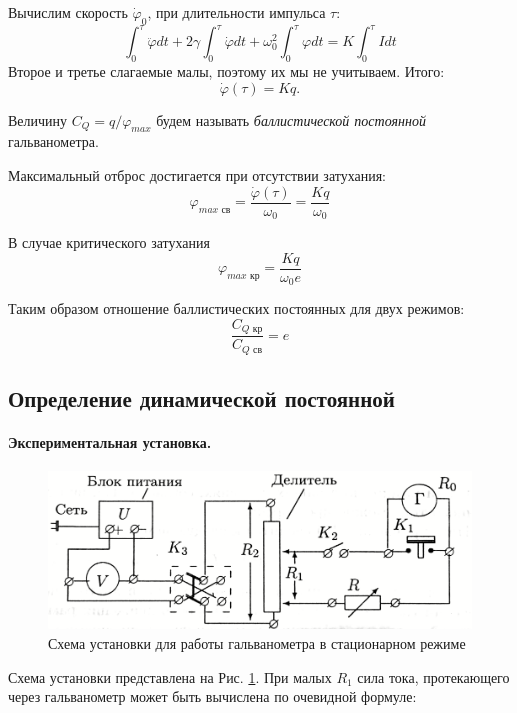 \documentclass[a4paper, 12pt, twoside]{article}
\begin{document}
Вычислим скорость $\dot{\varphi}_0$, при длительности импульса $\tau$:
\begin{equation}
\int_{0}^{\tau}\ddot{\varphi}dt + 2\gamma\int_{0}^{\tau}\dot{\varphi}dt + \omega_0^2\int_{0}^{\tau}\varphi dt = K\int_{0}^{\tau}Idt
\end{equation}
Второе и третье слагаемые малы, поэтому их мы не учитываем. Итого:
\begin{equation}
\dot{\varphi}(\tau) = Kq.
\end{equation}

Величину $C_Q = q/\varphi_{max}$ будем называть \textit{баллистической постоянной} гальванометра.

Максимальный отброс достигается при отсутствии затухания:
\begin{equation}
\varphi_{max\text{ св} } = \dfrac{\dot{\varphi}(\tau)}{\omega_0} = \dfrac{Kq}{\omega_0}
\end{equation}

В случае критического затухания
\begin{equation}
\varphi_{max\text{ кр} } = \dfrac{Kq}{\omega_0 e}
\end{equation}

Таким образом отношение баллистических постоянных для двух режимов:
\begin{equation}\nonumber
\dfrac{C_{Q\text{ кр}}}{C_{Q\text{ св}}} = e
\end{equation}

\subsection{Определение динамической постоянной}
\paragraph{Экспериментальная установка.}
\begin{figure}[H]
	\centering
	\includegraphics[width = 0.7\linewidth]{sch2}
	\caption{Схема установки для работы гальванометра в стационарном режиме}
	\label{sch:2}
\end{figure}
Схема установки представлена на Рис. \ref{sch:2}. При малых $R_1$ сила тока, протекающего через гальванометр может быть вычислена по очевидной формуле:
\end{document}
